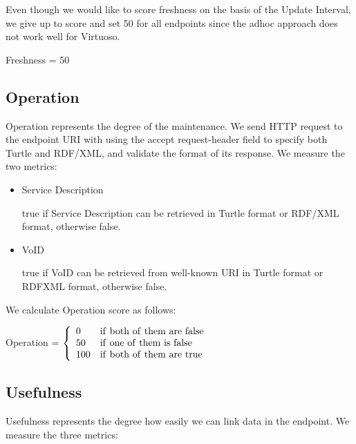 \documentclass[11pt,a4paper]{article}
\begin{document}
Even though we would like to score freshness on the basis of the Update Interval,
we give up to score and set 50 for all endpoints since the adhoc approach does not work well for Virtuoso.

\begin{mdframed}
  \center
Freshness = 50
\end{mdframed}

\subsection{Operation}

Operation represents the degree of the maintenance.
We send HTTP request to the endpoint URI with using the accept request-header field to specify both Turtle and RDF/XML, and validate the format of its response.
We measure the two metrics:

\begin{itemize}

  \item Service Description

  true if Service Description can be retrieved in Turtle format or RDF/XML format, otherwise false.

  \item VoID

  true if VoID can be retrieved from well-known URI\cite{Alexandar:11:VoID} in Turtle format or RDFXML format, otherwise false.

\end{itemize}

We calculate Operation score as follows:

\begin{mdframed}
\center
Operation = $\left\{
    \begin{array}{ll}
      0   & {\rm if~both~of~them~are~false } \\
      50  & {\rm if~one~of~them~is~false } \\
      100 & {\rm if~both~of~them~are~true }
  \end{array}
  \right.$
\end{mdframed}

\subsection{Usefulness}

Usefulness represents the degree how easily we can link data in the endpoint.
We measure the three metrics:
\end{document}
